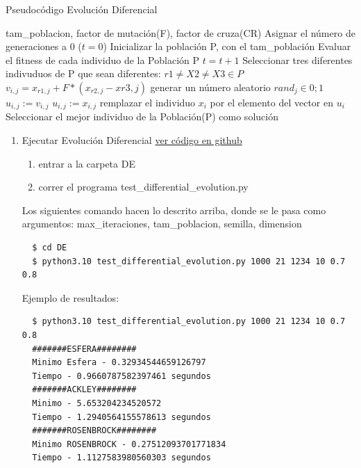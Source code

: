 \documentclass{article}
\begin{document}
\begin{algorithm} \caption{Pseudocódigo Evolución Diferencial}
  \begin{algorithmic}[1]
    \Require tam\_poblacion, factor de mutación(F), factor de cruza(CR)
    \State Asignar el número de generaciones a 0 ($t=0$)
    \State Inicializar la población P, con el tam\_población
    \State Evaluar el fitness de cada individuo de la Población P
    \Repeat
    \State $t=t+1$
    \State Seleccionar tres diferentes indivuduos de P que sean diferentes: $r1\neq X2 \neq X3 \in P$
    \State $v_{i,j} = x_{r1,j} + F * (x_{r2,j}-x{r3,j})$
    \State generar un número aleatorio $rand_{j} \in \mathcal 0;1$
    \State $u_{i,j} := v_{i,j}$
    \Else
    \State $u_{i,j}:=x_{i,j}$
    \EndIf
    \EndFor
    \State remplazar el individuo $x_i$ por el elemento del vector en $u_{i}$
    \EndIf
    \EndFor
    \State Seleccionar el mejor individuo de la Población(P) como solución
  \end{algorithmic}
\end{algorithm}

\begin{enumerate}
  \item Ejecutar Evolución Diferencial
    \href{https://github.com/luisballado/InteligenciaComputacional/tree/master/code/tarea1/DE}{ver código en github}\\
    \begin{enumerate}
    \item entrar a la carpeta DE \\
    \item correr el programa test\_differential\_evolution.py\\
    \end{enumerate} 

    Los siguientes comando hacen lo descrito arriba, donde se le pasa como argumentos: max\_iteraciones, tam\_poblacion, semilla, dimension
    
    \begin{commandline}
\begin{verbatim}
  $ cd DE
  $ python3.10 test_differential_evolution.py 1000 21 1234 10 0.7 0.8
\end{verbatim}
    \end{commandline}

    Ejemplo de resultados:

    \begin{commandline}
\begin{verbatim}
  $ python3.10 test_differential_evolution.py 1000 21 1234 10 0.7 0.8
  #######ESFERA########
  Minimo Esfera - 0.32934544659126797
  Tiempo - 0.9660787582397461 segundos
  #######ACKLEY########
  Minimo - 5.653204234520572
  Tiempo - 1.2940564155578613 segundos
  #######ROSENBROCK########
  Minimo ROSENBROCK - 0.27512093701771834
  Tiempo - 1.1127583980560303 segundos
\end{verbatim}
    \end{commandline}
\end{enumerate} 
\end{document}
